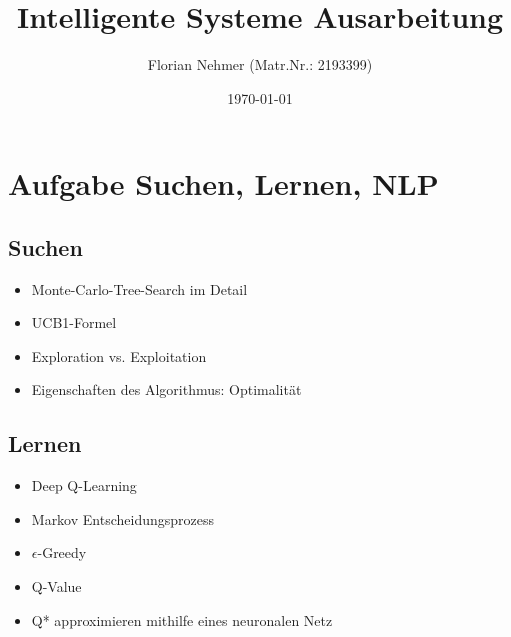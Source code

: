 \documentclass[a4paper, 11pt]{scrartcl}
\title{Intelligente Systeme Ausarbeitung}
\author{Florian Nehmer (Matr.Nr.: 2193399)}
\date{\today}
\begin{document}
\maketitle
\thispagestyle{empty}

\newpage
\tableofcontents
\thispagestyle{empty}

\newpage
{}


\section{Aufgabe Suchen, Lernen, NLP}

\subsection{Suchen}
\begin{itemize}
  \item Monte-Carlo-Tree-Search im Detail
  \item UCB1-Formel
  \item Exploration vs. Exploitation
  \item Eigenschaften des Algorithmus: Optimalität
\end{itemize}

\subsection{Lernen}
\begin{itemize}
  \item Deep Q-Learning
  \item Markov Entscheidungsprozess
  \item $\epsilon$-Greedy
  \item Q-Value
  \item Q* approximieren mithilfe eines neuronalen Netz
\end{itemize}
\end{document}
